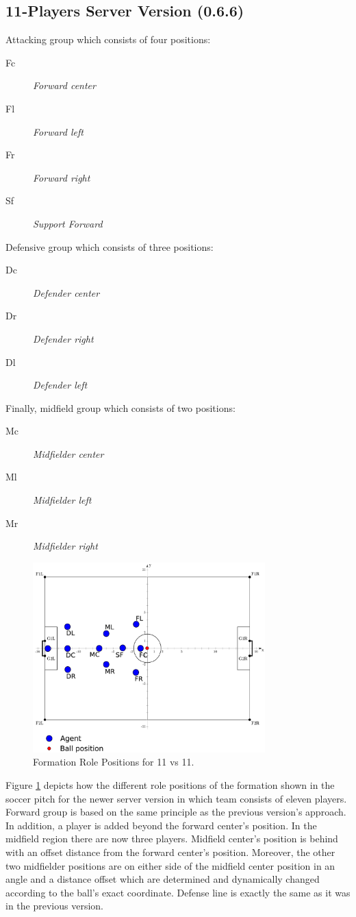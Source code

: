 \subsection{11-Players Server Version (0.6.6)}
Attacking group which consists of four positions:
\begin{description}
\item[Fc] \textit{Forward center}
\item[Fl] \textit{Forward left}
\item[Fr] \textit{Forward right}
\item[Sf] \textit{Support Forward}
\end{description}
Defensive group which consists of three positions:
\begin{description}
\item[Dc] \textit{Defender center}
\item[Dr] \textit{Defender right }
\item[Dl] \textit{Defender left}
\end{description}
Finally, midfield group which consists of two positions:
\begin{description}
\item[Mc] \textit{Midfielder center}
\item[Ml] \textit{Midfielder left}
\item[Mr] \textit{Midfielder right}
\end{description}
\begin{figure}[htb!]
\centering
  \includegraphics[width=0.8\textwidth]{Chapter4/figures/Formation11_0.pdf}
  \caption{Formation Role Positions for 11 vs 11.} 
  \label{fig:Formation11_0}
\end{figure}
Figure \ref{fig:Formation11_0} depicts how the different role positions of the formation shown in the soccer pitch for the newer server version in which team consists of eleven players. Forward group is based on the same principle as the previous version's approach. In addition, a player is added beyond the forward center's position. In the midfield region there are now three players. Midfield center's position is behind with an offset distance from the forward center's position. Moreover, the other two midfielder positions are on either side of the midfield center position in an angle and a distance offset which are determined and dynamically changed according to the ball's exact coordinate. Defense line is exactly the same as it was in the previous version.

